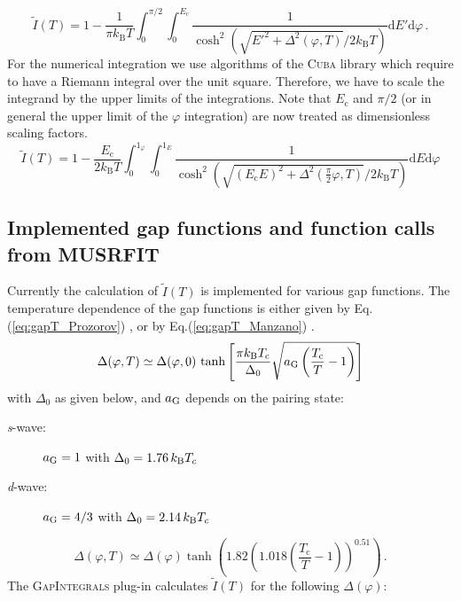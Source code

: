 \documentclass[twoside]{article}
\newcommand{\gapint}{\textsc{GapIntegrals}\xspace}
\begin{document}
\begin{equation}
\tilde{I}(T) = 1 - \frac{1}{\pi k_{\mathrm B}T}\int_0^{\pi/2}\int_{0}^{E_{\mathrm c}}\frac{1}{\cosh^2\left(\sqrt{E'^2+\Delta^2(\varphi,T)}/2k_{\mathrm B}T\right)}\mathrm{d}E'\mathrm{d}\varphi\,.
\end{equation}
For the numerical integration we use algorithms of the \textsc{Cuba} library \cite{cuba} which require to have a Riemann integral over the unit square. Therefore, we have to scale the integrand by the upper limits of the integrations. Note that $E_{\mathrm c}$ and $\pi/2$ (or in general the upper limit of the $\varphi$ integration) are now treated as dimensionless scaling factors.
\begin{equation}
\tilde{I}(T) =  1 - \frac{E_{\mathrm c}}{2k_{\mathrm B}T}\int_0^{1_{\varphi}}\int_{0}^{1_{E}}\frac{1}{\cosh^2\left(\sqrt{(E_{\mathrm c}E)^2+\Delta^2\left(\frac{\pi}{2}\varphi,T\right)}/2k_{\mathrm B}T\right)}\mathrm{d}E\mathrm{d}\varphi
\end{equation}

\subsection*{Implemented gap functions and function calls from MUSRFIT}
Currently the calculation of $\tilde{I}(T)$ is implemented for various gap functions.
The temperature dependence of the gap functions is either given by Eq.(\ref{eq:gapT_Prozorov}) \cite{Prozorov}, or by Eq.(\ref{eq:gapT_Manzano}) \cite{Manzano}.
\begin{equation}\label{eq:gapT_Prozorov}
 \Delta(\varphi,T) \simeq \Delta(\varphi,0)\,\tanh\left[\frac{\pi k_{\rm B} T_{\rm c}}{\Delta_0}\sqrt{a_{\rm G} \left(\frac{T_{\rm c}}{T}-1\right)}\right]
\end{equation}
\noindent with $\Delta_0$ as given below, and $a_{\rm G}$ depends on the pairing state:

\begin{description}
 \item [\textit{s}-wave:] $a_{\rm G}=1$ \qquad with $\Delta_0 = 1.76\, k_{\rm B} T_c$
 \item [\textit{d}-wave:] $a_{\rm G}=4/3$ \quad with $\Delta_0 = 2.14\, k_{\rm B} T_c$
\end{description}

\begin{equation}\label{eq:gapT_Manzano}
\Delta(\varphi,T) \simeq \Delta(\varphi)\tanh\left(1.82\left(1.018\left(\frac{T_{\mathrm c}}{T}-1\right)\right)^{0.51}\right)\,.
\end{equation}
The \gapint plug-in calculates $\tilde{I}(T)$ for the following $\Delta(\varphi)$:
\end{document}
